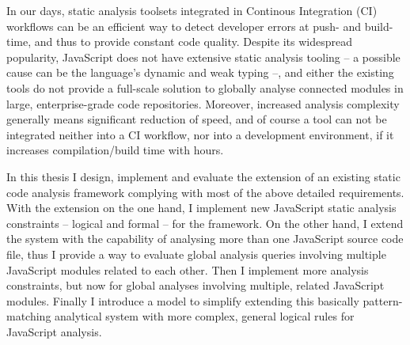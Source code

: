 	In our days, static analysis toolsets integrated in Continous Integration (CI) workflows can be an efficient way to detect developer errors at push- and build-time, and thus to provide constant code quality. Despite its widespread popularity, JavaScript does not have extensive static analysis tooling – a possible cause can be the language's dynamic and weak typing –, and either the existing tools do not provide a full-scale solution to globally analyse connected modules in large, enterprise-grade code repositories. Moreover, increased analysis complexity generally means significant reduction of speed, and of course a tool can not be integrated neither into a CI workflow, nor into a development environment, if it increases compilation/build time with hours.

	In this thesis I design, implement and evaluate the extension of an existing static code analysis framework complying with most of the above detailed requirements. With the extension on the one hand, I implement new JavaScript static analysis constraints – logical and formal – for the framework. On the other hand, I extend the system with the capability of analysing more than one JavaScript source code file, thus I provide a way to evaluate global analysis queries involving multiple JavaScript modules related to each other. Then I implement more analysis constraints, but now for global analyses involving multiple, related JavaScript modules. Finally I introduce a model to simplify extending this basically pattern-matching analytical system with more complex, general logical rules for JavaScript analysis.


